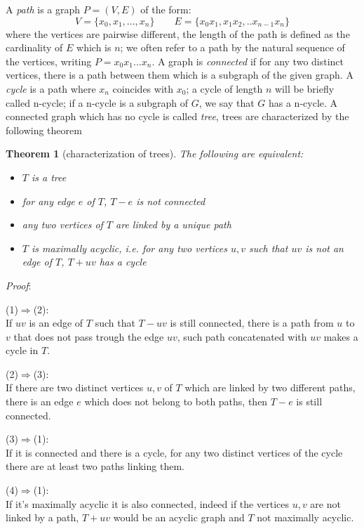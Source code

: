 \documentclass[a4paper,12pt,oneside]{book}
\newtheorem{theorem}{Theorem}[chapter]
\begin{document}
A \textit{path} is a graph $P=(V,E)$ of the form:
$$ V=\{x_0,x_1, ..., x_n\} \qquad E=\{x_0 x_1, x_1x_2,.. x_{n-1}x_n\}$$ 
where the vertices are pairwise different, the length of the path is defined as the cardinality of $E$ which is $n$; we often refer to a path by the natural sequence of the vertices, writing $P=x_0x_1...x_n$. A graph is \textit{connected} if for any two distinct vertices, there is a path between them which is a subgraph of the given graph.  
A \textit{cycle} is a path where $x_n$ coincides with $x_0$; a cycle of length $n$ will be briefly called n-cycle; if a n-cycle is a subgraph of $G$, we say that $G$ has a n-cycle. 
 A connected graph which has no cycle is called \textit{tree}, trees are characterized by the following theorem 

\begin{theorem}[characterization of trees] The following are equivalent:
\begin{itemize}
\item[(1)] $T$ is a tree
\item[(2)] for any edge $e$ of $T$, $T-e$ is not connected   
\item[(3)] any two vertices of $T$ are linked by a unique path
\item[(4)] $T$ is maximally acyclic, i.e. for any two vertices $u,v$ such that $uv$ is not an edge of $T$, $T+uv$ has a cycle
\end{itemize}
\end{theorem}
\noindent\textit{Proof}: 

(1)$\Rightarrow$(2):\\
If $uv$ is an edge of $T$ such that $T-uv$ is still connected, there is a path from $u$ to $v$ that does not pass trough the edge $uv$, such path concatenated with $uv$ makes a cycle in $T$.

(2)$\Rightarrow$(3):\\
If there are two distinct vertices $u,v$ of $T$ which are linked by two different  paths, there is an edge $e$ which does not belong to both paths, then $T-e$ is still connected.

(3)$\Rightarrow$(1):\\
If it is connected and there is a cycle, for any two distinct vertices of the cycle there  are at least two paths linking them.

(4)$\Rightarrow$(1):\\
If it's maximally acyclic it is also connected, indeed if the vertices $u,v$ are not linked by a path, $T+uv$ would be an acyclic graph and $T$ not maximally acyclic. 
\end{document}
